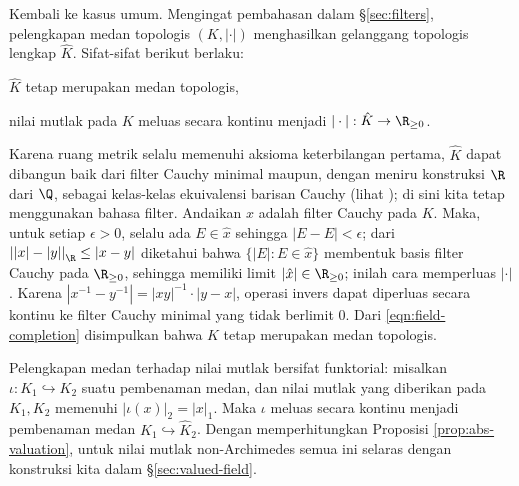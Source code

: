 Kembali ke kasus umum. Mengingat pembahasan dalam \S\ref{sec:filters}, pelengkapan medan topologis $(K, |\cdot|)$ menghasilkan gelanggang topologis lengkap $\hat{K}$. Sifat-sifat berikut berlaku:
\begin{compactitem}
	\item $\hat{K}$ tetap merupakan medan topologis,
	\item nilai mutlak pada $K$ meluas secara kontinu menjadi $|\cdot|: \hat{K} \to \R_{\geq 0}$.
\end{compactitem}
Karena ruang metrik selalu memenuhi aksioma keterbilangan pertama, $\hat{K}$ dapat dibangun baik dari filter Cauchy minimal maupun, dengan meniru konstruksi $\R$ dari $\Q$, sebagai kelas-kelas ekuivalensi barisan Cauchy (lihat \cite[\S 8.1]{Xiong}); di sini kita tetap menggunakan bahasa filter. Andaikan $\hat{x}$ adalah filter Cauchy pada $K$. Maka, untuk setiap $\epsilon > 0$, selalu ada $E \in \hat{x}$ sehingga $|E-E| < \epsilon$; dari $\left| |x| - |y| \right|_\R \leq  |x - y|$ diketahui bahwa $\{ |E|: E \in \hat{x} \}$ membentuk basis filter Cauchy pada $\R_{\geq 0}$, sehingga memiliki limit $|\hat{x}| \in \R_{\geq 0}$; inilah cara memperluas $|\cdot|$. Karena $|x^{-1} - y^{-1}| = |xy|^{-1} \cdot |y-x|$, operasi invers dapat diperluas secara kontinu ke filter Cauchy minimal yang tidak berlimit $0$. Dari \eqref{eqn:field-completion} disimpulkan bahwa $\hat{K}$ tetap merupakan medan topologis.

Pelengkapan medan terhadap nilai mutlak bersifat funktorial: misalkan $\iota: K_1 \hookrightarrow K_2$ suatu pembenaman medan, dan nilai mutlak yang diberikan pada $K_1, K_2$ memenuhi $|\iota(x)|_2 = |x|_1$. Maka $\iota$ meluas secara kontinu menjadi pembenaman medan $\hat{K}_1 \hookrightarrow \hat{K}_2$. Dengan memperhitungkan Proposisi \ref{prop:abs-valuation}, untuk nilai mutlak non-Archimedes semua ini selaras dengan konstruksi kita dalam \S\ref{sec:valued-field}.

